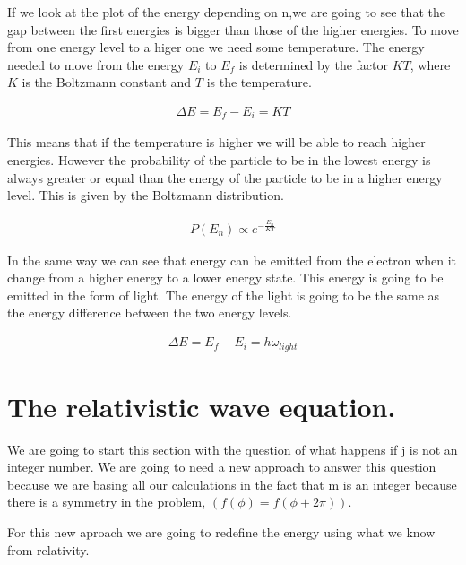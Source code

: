 If we look at the plot of  the energy depending on n,we are going to see that the gap between the first energies is bigger than those of the higher energies. To move from one energy level to a higer one we need some temperature. The energy needed to move from the energy $E_i$ to $E_f$ is determined by the factor $KT$, where $K$ is the Boltzmann constant and $T$ is the temperature.

\begin{equation}
  \begin{array}{c}
    \Delta E = E_f - E_i = KT
  \end{array}
\end{equation}

This means that if the temperature is higher we will be able to reach higher energies. However the probability of the particle to be in the lowest energy is always greater or equal than the energy of the particle to be in a higher energy level. This is given by the Boltzmann distribution.

\begin{equation}
  \begin{array}{c}
    P(E_n) \propto e^{-\frac{E_n}{KT}}
  \end{array}
\end{equation}

In the same way we can see that energy can be emitted from the electron when it change from a higher energy to a lower energy state. This energy is going to be emitted in the form of light. The energy of the light is going to be the same as the energy difference between the two energy levels.

\begin{equation}
  \begin{array}{c}
    \Delta E = E_f - E_i = h\omega_{light}
  \end{array}
\end{equation}


\section{The relativistic wave equation.}

We are going to start this section with the question of what happens if j is not an integer number. We are going to need a new approach to answer this question because we are basing all our calculations in the fact that m is an integer because there is a symmetry in the problem, $(f(\phi)=f(\phi+2\pi))$.

For this new aproach we are going to redefine the energy using what we know from relativity.

